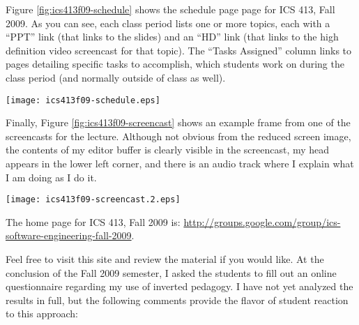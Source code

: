 \documentclass[11pt]{article}
\begin{document}
Figure \ref{fig:ics413f09-schedule} shows the schedule page page for ICS
413, Fall 2009.  As you can see, each class period lists one or more
topics, each with a ``PPT'' link (that links to the slides) and an ``HD''
link (that links to the high definition video screencast for that topic).
The ``Tasks Assigned'' column links to pages detailing specific tasks to
accomplish, which students work on during the class period (and normally
outside of class as well). 


\begin{figure*}[ht]
  \center
  \texttt{[image: ics413f09-schedule.eps]}
  \caption{ICS 413, Fall 2009 Schedule Page}
  \label{fig:ics413f09-schedule}
\end{figure*}  


Finally, Figure \ref{fig:ics413f09-screencast} shows an example frame from
one of the screencasts for the lecture.  Although not obvious from the
reduced screen image, the contents of my editor buffer is clearly visible
in the screencast, my head appears in the lower left corner, and there is
an audio track where I explain what I am doing as I do it. 

\begin{figure*}[ht]
  \center
  \texttt{[image: ics413f09-screencast.2.eps]}
  \caption{ICS 413, Fall 2009 example screencast frame}
  \label{fig:ics413f09-screencast}
\end{figure*}  

The home page for ICS 413, Fall 2009 is: \newline
\url{http://groups.google.com/group/ics-software-engineering-fall-2009}.

Feel free to visit this site and review the material if you would
like.  At the conclusion of the Fall 2009 semester, I asked the students to fill
out an online questionnaire regarding my use of inverted pedagogy.  I have
not yet analyzed the results in full, but the following comments provide
the flavor of student reaction to this approach:
\end{document}

